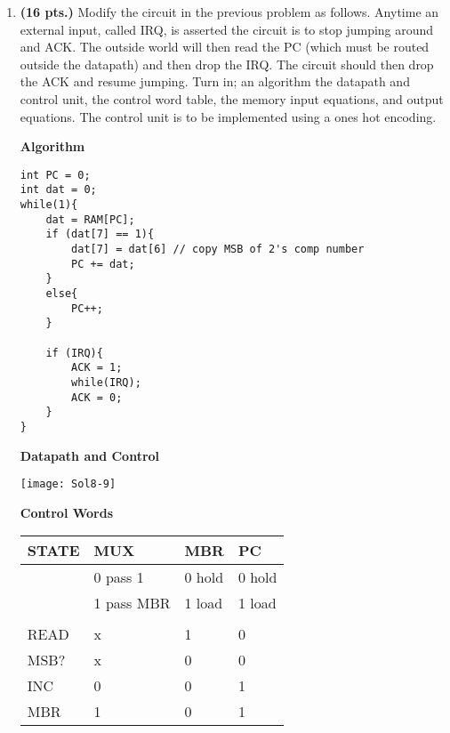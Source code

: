 \begin{enumerate}
    \item \textbf{ (16 pts.)}
        Modify the circuit in the previous problem as follows.  Anytime
        an external input, called IRQ, is asserted the circuit is to stop
        jumping around and ACK.  The outside world will then read
        the PC (which must be routed outside the datapath) and then drop the
        IRQ.  The circuit should then drop the ACK and resume jumping.
        Turn in; an algorithm the datapath and control unit, the control word
        table, the memory input equations, and output equations.
        The control unit is to be implemented using a ones hot encoding.
        \begin{onlysolution}[fragile]
            \textbf{Algorithm}
\begin{verbatim}
int PC = 0;
int dat = 0;
while(1){
    dat = RAM[PC];
    if (dat[7] == 1){
        dat[7] = dat[6] // copy MSB of 2's comp number
        PC += dat;
    }
    else{
        PC++;
    }

    if (IRQ){
        ACK = 1;
        while(IRQ);
        ACK = 0;
    }
}
\end{verbatim}
            \textbf{Datapath and Control}\par

            \texttt{[image: Sol8-9]}

            \textbf{Control Words}

            \begin{tabular}{l|l|l|l}
                STATE & MUX        & MBR    & PC     \\ \hline
                & 0 pass 1   & 0 hold & 0 hold \\ \hline
                & 1 pass MBR & 1 load & 1 load \\ \hline
                &            &        &        \\ \hline
                READ  & x          & 1      & 0      \\ \hline
                MSB?  & x          & 0      & 0      \\ \hline
                INC   & 0          & 0      & 1      \\ \hline
                MBR   & 1          & 0      & 1      \\
            \end{tabular}


\end{onlysolution}
\end{enumerate}
